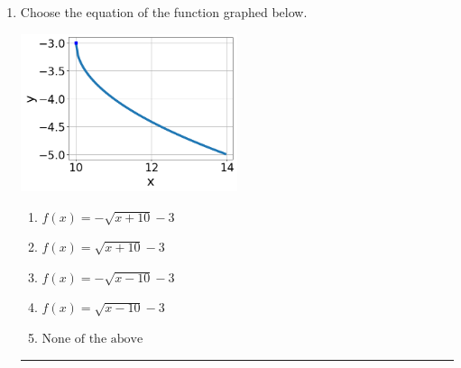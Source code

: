 \documentclass[14pt]{extbook}
\newcommand{\litem}[1]{\item#1\hspace*{-1cm}\rule{\textwidth}{0.4pt}}
\begin{document}
\begin{enumerate}
\litem{
Choose the equation of the function graphed below.
\begin{center}
    \includegraphics[width=0.5\textwidth]{../Figures/radicalGraphToEquationA.png}
\end{center}
\begin{enumerate}[label=\Alph*.]
\item \( f(x) = - \sqrt{x + 10} - 3 \)
\item \( f(x) = \sqrt{x + 10} - 3 \)
\item \( f(x) = - \sqrt{x - 10} - 3 \)
\item \( f(x) = \sqrt{x - 10} - 3 \)
\item \( \text{None of the above} \)


\end{enumerate}}
\end{enumerate}
\end{document}
